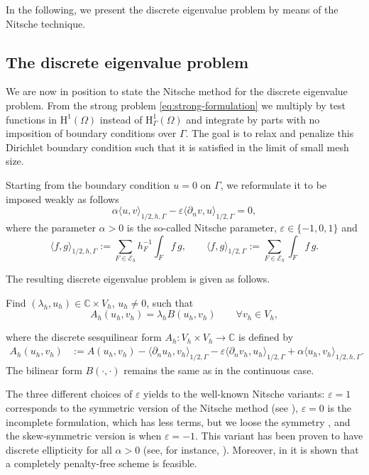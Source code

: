 \documentclass[onefignum,onetabnum,final]{siamart250211}
\numberwithin{equation}{section}
\newcommand\0{\boldsymbol{0}}
\renewcommand\H{\mathrm{H}}
\def\l{\lambda}
\def\CE{{\mathcal E}}
\begin{document}
	In the following, we present the discrete eigenvalue problem by means of the Nitsche technique.
	
	\subsection{The discrete eigenvalue problem}
	We are now in position to state the Nitsche method for the discrete eigenvalue problem. From the strong problem \eqref{eq:strong-formulation} we multiply by test functions in $\H^1(\Omega)$ instead of $\H_{\Gamma}^1(\Omega)$ and integrate by parts with no imposition of boundary conditions over $\Gamma$. The goal is to relax and penalize this Dirichlet boundary condition such that it is satisfied in the limit of small mesh size.
	
	Starting from the boundary condition $u=0$ on  $\Gamma$, we reformulate it to be imposed weakly as follows
	$$
	\alpha\langle u,v \rangle_{1/2,h,\Gamma} - \varepsilon\langle \partial_n v,u \rangle_{1/2,\Gamma} = 0,
	$$
	where the parameter $\alpha>0$ is the so-called Nitsche parameter, $\varepsilon\in\{-1,0,1\}$ and
	$$\langle f,g\rangle_{1/2,h,\Gamma}:=\sum_{F\in\CE_{h}}h_F^{-1}\int_F f\,g, \qquad \langle f,g\rangle_{1/2,\Gamma} := \sum_{F\in\CE_{h}}\int_F f\,g.$$
	
	The resulting discrete eigenvalue problem is given as follows.
	\begin{problem}
		\label{P2-discrete}
		Find $(\l_h,u_h)\in\mathbb{C}\times V_h$, $u_h\ne0$, such that
		$$
		A_h(u_h,v_h)=\l_h B(u_h,v_h)\qquad\forall v_h\in V_h,
		$$
	\end{problem}
	where the discrete sesquilinear form $A_h:V_h\times V_h\rightarrow\mathbb{C}$
	is defined by
	\begin{align*}
		A_h(u_h,v_h)
		& :=A(u_h,v_h) - \langle \partial_n u_h,v_h \rangle_{1/2,\Gamma} - \varepsilon\langle \partial_n v_h,u_h \rangle_{1/2,\Gamma} + \alpha\langle u_h,v_h \rangle_{1/2,h,\Gamma}.
	\end{align*}
	The bilinear form $B(\cdot,\cdot)$ remains the same as in the continuous case.
	
	The three different choices of $\varepsilon$ yields to the well-known Nitsche variants: $\varepsilon=1$ corresponds to the symmetric version of the Nitsche method (see \cite{nitsche1971variationsprinzip,burman2023augmented}), $\varepsilon=0$ is the incomplete formulation, which has less terms, but we loose the symmetry \cite[Section 37.1]{ern2021finite}, and the skew-symmetric version is when $\varepsilon=-1$. This variant has been proven to have discrete ellipticity for all $\alpha>0$ (see, for instance, \cite{freund1995weakly}). Moreover, in \cite{burman2012penalty} it is shown that a completely penalty-free scheme is feasible.
	
\end{document}
